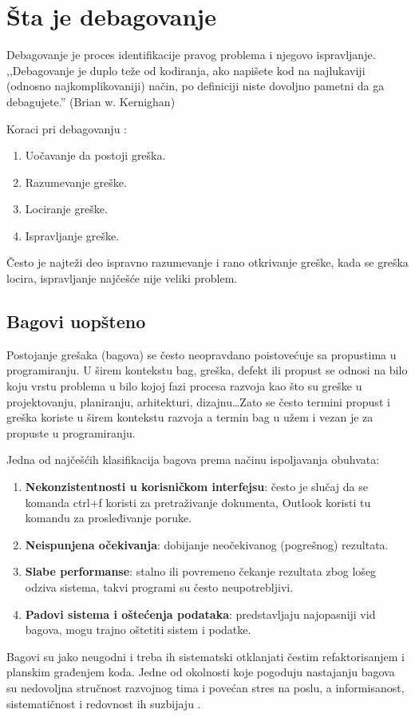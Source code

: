 \documentclass[a4paper]{article}
\begin{document}
\section{Šta je debagovanje}
\label{sec:sta je debagovanje}

Debagovanje je proces identifikacije pravog problema i njegovo ispravljanje.
,,Debagovanje je duplo teže od kodiranja, ako napišete kod na najlukaviji
(odnosno najkomplikovaniji) način, po definiciji niste dovoljno pametni da ga
debagujete.'' (Brian w. Kernighan) \cite{debagovanje_vladaf}


Koraci pri debagovanju \cite{bagovi_smalkov}:
\begin{enumerate}
\item Uočavanje da postoji greška.
\item Razumevanje greške.
\item Lociranje greške.
\item Ispravljanje greške.
\end{enumerate}

Često je najteži deo ispravno razumevanje i rano otkrivanje greške, kada se greška locira, ispravljanje najčešće nije veliki problem.


\subsection{Bagovi uopšteno}
\label{subsec:podnaslov1}

Postojanje grešaka (bagova) se često neopravdano poistovećuje sa propustima u
programiranju.  U širem kontekstu bag, greška, defekt ili propust se odnosi na
bilo koju vrstu problema u bilo kojoj fazi procesa razvoja kao što su greške u
projektovanju, planiranju, arhitekturi, dizajnu\ldots Zato se često termini
propust i greška koriste u širem kontekstu razvoja a termin bag u užem i vezan
je za propuste u programiranju.

Jedna od najčešćih klasifikacija bagova prema načinu ispoljavanja obuhvata:
\begin{enumerate}
	\item \textbf{Nekonzistentnosti u korisničkom interfejsu}: često je slučaj da se komanda ctrl+f koristi za pretraživanje dokumenta, Outlook koristi   
	tu komandu za prosleđivanje poruke.
	\item \textbf{Neispunjena očekivanja}: dobijanje neočekivanog (pogrešnog) rezultata.
	\item \textbf{Slabe performanse}: stalno ili povremeno čekanje rezultata zbog lošeg odziva sistema, takvi programi su često neupotrebljivi.
	\item \textbf{Padovi sistema i oštećenja podataka}: predstavljaju najopasniji vid bagova, mogu trajno oštetiti sistem i podatke.
\end{enumerate}
\indent Bagovi su jako neugodni i treba ih sistematski otklanjati čestim refaktorisanjem i planskim građenjem koda. Jedne od okolnosti koje pogoduju nastajanju bagova su nedovoljna stručnost razvojnog tima i povećan stres na poslu, a informisanost, sistematičnost i redovnost ih suzbijaju \cite{bagovi_smalkov}.
\end{document}
